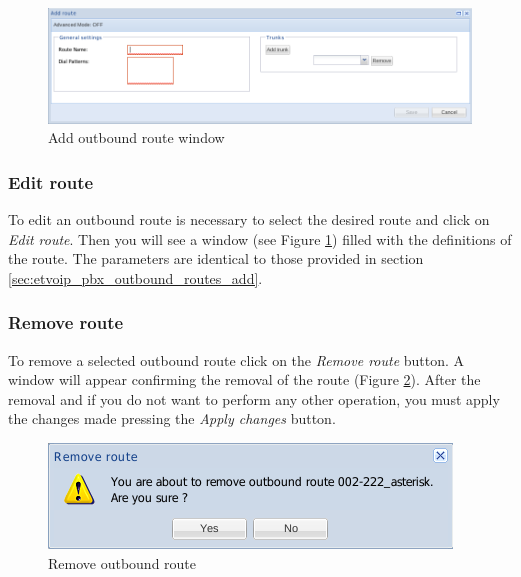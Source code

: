 \begin{figure}[H]
        \begin{center}
        \includegraphics[scale=0.45]{screenshots/etvoip_pbx_outbound_routes_add.png}
        \caption{Add outbound route window}
        \label{fig:etvoip_pbx_outbound_routes_add}
        \end{center}
\end{figure}


\subsubsection{Edit route}
To edit an outbound route is necessary to select the desired route and click on \emph{Edit route}. Then you will see a window (see Figure \ref{fig:etvoip_pbx_outbound_routes_add}) filled with the definitions of the route.
The parameters are identical to those provided in section \ref{sec:etvoip_pbx_outbound_routes_add}.

\subsubsection{Remove route}
To remove a selected outbound route click on the \emph{Remove route} button.
A window will appear confirming the removal of the route (Figure \ref{fig:etvoip_pbx_outbound_routes_remove}). After the removal and if you do not want to perform any other operation, you must apply the changes made pressing the \emph{Apply changes} button.

\begin{figure}[H]
        \begin{center}
        \includegraphics[scale=0.6]{screenshots/etvoip_pbx_outbound_routes_remove.png}
        \caption{Remove outbound route}
        \label{fig:etvoip_pbx_outbound_routes_remove}
        \end{center}
\end{figure}


